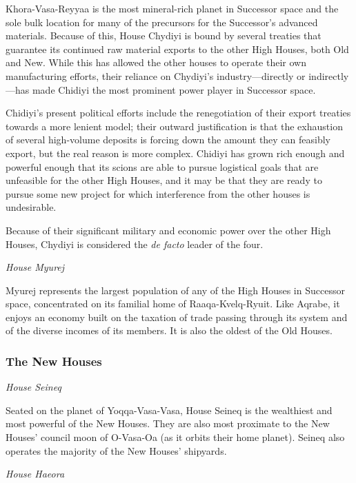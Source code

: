 \documentclass[11pt]{report}
\begin{document}
    Khora-Vasa-Reyyaa is the most mineral-rich planet in Successor space and the sole bulk location for many of the precursors for the Successor's advanced materials. Because of this, House Chydiyi is bound by several treaties that guarantee its continued raw material exports to the other High Houses, both Old and New. While this has allowed the other houses to operate their own manufacturing efforts, their reliance on Chydiyi's industry---directly or indirectly---has made Chidiyi the most prominent power player in Successor space.

    Chidiyi's present political efforts include the renegotiation of their export treaties towards a more lenient model; their outward justification is that the exhaustion of several high-volume deposits is forcing down the amount they can feasibly export, but the real reason is more complex. Chidiyi has grown rich enough and powerful enough that its scions are able to pursue logistical goals that are unfeasible for the other High Houses, and it may be that they are ready to pursue some new project for which interference from the other houses is undesirable.

    Because of their significant military and economic power over the other High Houses, Chydiyi is considered the \emph{de facto} leader of the four.

    \bigskip

    \noindent
    \emph{House Myurej}

    Myurej represents the largest population of any of the High Houses in Successor space, concentrated on its familial home of Raaqa-Kvelq-Ryuit. Like Aqrabe, it enjoys an economy built on the taxation of trade passing through its system and of the diverse incomes of its members. It is also the oldest of the Old Houses. 
    \bigskip

    \subsubsection{The New Houses}

    \noindent
    \emph{House Seineq}

    Seated on the planet of Yoqqa-Vasa-Vasa, House Seineq is the wealthiest and most powerful of the New Houses. They are also most proximate to the New Houses' council moon of O-Vasa-Oa (as it orbits their home planet). Seineq also operates the majority of the New Houses' shipyards.
    \bigskip

    \noindent
    \emph{House Haeora}
\end{document}
